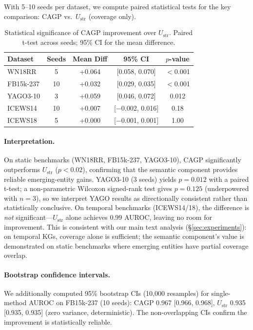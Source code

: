 \documentclass{article}
\begin{document}
With 5--10 seeds per dataset, we compute paired statistical tests for the key comparison: CAGP vs.\ $U_{\text{str}}$ (coverage only).

\begin{table}[ht]
\centering
\caption{Statistical significance of CAGP improvement over $U_{\text{str}}$. Paired t-test across seeds; 95\% CI for the mean difference.}
\label{tab:significance}
\small
\begin{tabular}{lcccc}
\toprule
Dataset & Seeds & Mean Diff & 95\% CI & $p$-value \\
\midrule
WN18RR & 5 & +0.064 & [0.058, 0.070] & $<$0.001 \\
FB15k-237 & 10 & +0.032 & [0.029, 0.035] & $<$0.001 \\
YAGO3-10 & 3 & +0.059 & [0.046, 0.072] & 0.012 \\
\midrule
ICEWS14 & 10 & +0.007 & [$-$0.002, 0.016] & 0.18 \\
ICEWS18 & 5 & +0.000 & [$-$0.001, 0.001] & 1.00 \\
\bottomrule
\end{tabular}
\end{table}

\paragraph{Interpretation.}
On static benchmarks (WN18RR, FB15k-237, YAGO3-10), CAGP significantly outperforms $U_{\text{str}}$ ($p < 0.02$), confirming that the semantic component provides reliable emerging-entity gains. YAGO3-10 (3 seeds) yields $p=0.012$ with a paired t-test; a non-parametric Wilcoxon signed-rank test gives $p=0.125$ (underpowered with $n{=}3$), so we interpret YAGO results as directionally consistent rather than statistically conclusive. On temporal benchmarks (ICEWS14/18), the difference is \emph{not} significant---$U_{\text{str}}$ alone achieves 0.99 AUROC, leaving no room for improvement. This is consistent with our main text analysis (\S\ref{sec:experiments}): on temporal KGs, coverage alone is sufficient; the semantic component's value is demonstrated on static benchmarks where emerging entities have partial coverage overlap.

\paragraph{Bootstrap confidence intervals.}
We additionally computed 95\% bootstrap CIs (10{,}000 resamples) for single-method AUROC on FB15k-237 (10 seeds): CAGP 0.967 [0.966, 0.968], $U_{\text{str}}$ 0.935 [0.935, 0.935] (zero variance, deterministic). The non-overlapping CIs confirm the improvement is statistically reliable.
\end{document}
